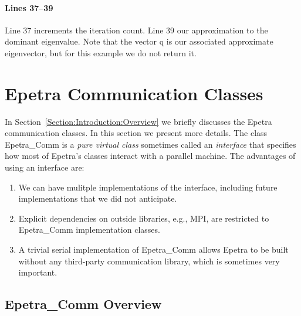 \documentclass[12pt,relax]{EpetraUserGuide}
\newcommand{\comm}{Epetra\_Comm}
\begin{document}
\paragraph{Lines 37--39}
Line 37 increments the iteration count.  Line 39 our approximation to
the dominant eigenvalue.  Note that the vector q is our associated
approximate eigenvector, but for this example we do not return it.

\section{Epetra Communication Classes}

In Section~\ref{Section:Introduction:Overview} we briefly discusses
the Epetra communication classes.  In this section we present more
details.  The class \comm{} is a {\it pure virtual class} sometimes
called an {\it interface} that
specifies how most of Epetra's classes interact with a parallel
machine.  The advantages of using an interface are:
\begin{enumerate}
\item We can have mulitple implementations of the interface, including future
implementations that we did not anticipate.
\item Explicit dependencies on outside libraries, e.g., MPI, are
restricted to \comm{} implementation classes.
\item A trivial serial implementation of \comm{} allows Epetra to be
built without any third-party communication library, which is
sometimes very important.
\end{enumerate}

\subsection{\comm{} Overview}
\end{document}
